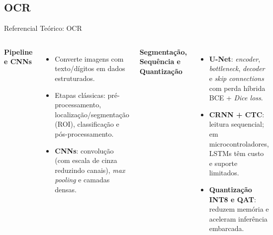 \documentclass[
    aspectratio=169,
    11pt,
    brazil
]{beamer}
\begin{document}
\subsection{OCR}
\begin{frame}{Referencial Teórico: OCR}
  \begin{columns}[t]
    {\footnotesize\bfseries\color{senacblue}Pipeline e CNNs}
    \begin{itemize}\scriptsize
      \setlength{\itemsep}{3pt}
      \item Converte imagens com texto/dígitos em dados estruturados.
      \item Etapas clássicas: pré-processamento, localização/segmentação (ROI), classificação e pós-processamento.
      \item \textbf{CNNs}: convolução (com escala de cinza reduzindo canais), \textit{max pooling} e camadas densas.
    \end{itemize}
    {\footnotesize\bfseries\color{senacblue}Segmentação, Sequência e Quantização}
    \begin{itemize}\scriptsize
      \setlength{\itemsep}{3pt}
      \item \textbf{U-Net}: \textit{encoder}, \textit{bottleneck}, \textit{decoder} e \textit{skip connections} com perda híbrida BCE + \textit{Dice loss}.
      \item \textbf{CRNN + CTC}: leitura sequencial; em microcontroladores, LSTMs têm custo e suporte limitados.
      \item \textbf{Quantização INT8 e QAT}: reduzem memória e aceleram inferência embarcada.
    \end{itemize}
  \end{columns}
\end{frame}
\end{document}
